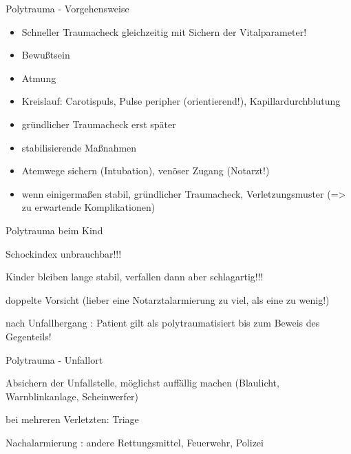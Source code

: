 \documentclass{article}
\begin{document}
{\mdseries\color{black}
Polytrauma - Vorgehensweise}

\begin{itemize}
\item {\mdseries\color[rgb]{0.0,0.0,0.5019608}
Schneller Traumacheck gleichzeitig  mit  Sichern der Vitalparameter!}

\item {\mdseries\color[rgb]{0.0,0.0,0.5019608}
Bewu{\ss}tsein}

\item {\mdseries\color[rgb]{0.0,0.0,0.5019608}
Atmung}

\item {\mdseries\color[rgb]{0.0,0.0,0.5019608}
Kreislauf: Carotispuls, Pulse peripher  (orientierend!),
Kapillardurchblutung}

\item {\mdseries\color[rgb]{0.0,0.0,0.5019608}
gr\"undlicher Traumacheck erst sp\"ater}

\item {\mdseries\color[rgb]{0.0,0.0,0.5019608}
stabilisierende Ma{\ss}nahmen}

\item {\mdseries\color[rgb]{0.0,0.0,0.5019608}
Atemwege sichern (Intubation),  ven\"oser  Zugang (Notarzt!)}

\item {\mdseries\color[rgb]{0.0,0.0,0.5019608}
wenn einigerma{\ss}en stabil, gr\"undlicher  Traumacheck,
Verletzungsmuster (={\textgreater} zu  erwartende Komplikationen)}

\end{itemize}
{\mdseries\color{black}
Polytrauma beim Kind}

{\mdseries
Schockindex unbrauchbar!!!}

{\mdseries
Kinder bleiben lange stabil, verfallen  dann aber schlagartig!!!}

{\mdseries
doppelte Vorsicht (lieber eine  Notarztalarmierung zu viel, als eine zu 
wenig!)}

{\mdseries
nach Unfallhergang : Patient gilt als polytraumatisiert  bis zum Beweis 
des Gegenteils! }

{\mdseries\color{black}
Polytrauma - Unfallort}

{\mdseries
Absichern  der Unfallstelle,  m\"oglichst auff\"allig machen (Blaulicht,
 Warnblinkanlage, Scheinwerfer)}

{\mdseries
bei mehreren Verletzten: Triage}

{\mdseries
Nachalarmierung : andere  Rettungsmittel, Feuerwehr, Polizei}
\end{document}
